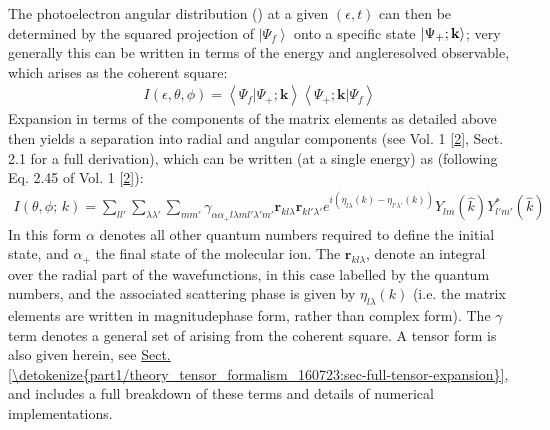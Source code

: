 \documentclass[letterpaper,table,10pt,english]{jupyterBook}
\begin{document}
\sphinxAtStartPar
The photoelectron angular distribution ({\hyperref[\detokenize{backmatter/glossary:term-PADs}]{}}) at a given \((\epsilon,t)\)
can then be determined by the squared projection of
\(\left|\Psi_f\right>\) onto a specific state
\(\left|\Psi_{+};\bf{k}\right>\); very generally this can be written in terms of the energy and angle\sphinxhyphen{}resolved observable, which arises as the coherent square:
\begin{equation}\label{equation:part1/theory_photoionization_dynamics_140723:eq:matE-sq-general}
\begin{split}
I(\epsilon,\theta,\phi)=\left<\Psi_f|\Psi_{+};\mathbf{k}\right>\left<\Psi_{+};\mathbf{k}|\Psi_f\right>
\end{split}
\end{equation}
\sphinxAtStartPar
Expansion in terms of the components of the matrix elements as detailed above then yields a separation into radial and angular components (see  Vol. 1 {[}\hyperlink{cite.backmatter/bibliography:id663}{2}{]}, Sect. 2.1 for a full derivation), which can be written (at a single energy) as (following Eq. 2.45 of  Vol. 1 {[}\hyperlink{cite.backmatter/bibliography:id663}{2}{]}):
\begin{equation}\label{equation:part1/theory_photoionization_dynamics_140723:eq:I-reduced-LF-2_45-vol1}
\begin{split}
I(\theta,\phi;\,k)=\sum_{ll'}\sum_{\lambda\lambda'}\sum_{mm'}\gamma_{\alpha\alpha_{+}l\lambda ml'\lambda'm'}\boldsymbol{r}_{kl\lambda}\boldsymbol{r}_{kl'\lambda'}e^{i(\eta_{l\lambda}(k)-\eta_{l'\lambda'}(k))}Y_{lm}(\hat{k})Y_{l'm'}^{*}(\hat{k})
\end{split}
\end{equation}
\sphinxAtStartPar
In this form \(\alpha\) denotes all other quantum numbers required to define the initial state, and \(\alpha_{+}\) the final state of the molecular ion. The {\hyperref[\detokenize{backmatter/glossary:term-radial-matrix-elements}]{}} \(\boldsymbol{r}_{kl\lambda}\), denote an integral over the radial part of the wavefunctions, in this case labelled by the {\hyperref[\detokenize{backmatter/glossary:term-MF}]{}} quantum numbers, and the associated scattering phase is given by \(\eta_{l\lambda}(k)\) (i.e. the matrix elements are written in magnitude\sphinxhyphen{}phase form, rather than complex form). The \(\gamma\) term denotes a general set of {\hyperref[\detokenize{backmatter/glossary:term-geometric-coupling-parameters}]{}} arising from the coherent square. A tensor form is also given herein, see \hyperref[\detokenize{part1/theory_tensor_formalism_160723:sec-full-tensor-expansion}]{Sect.\@ \ref{\detokenize{part1/theory_tensor_formalism_160723:sec-full-tensor-expansion}}}, and includes a full breakdown of these terms and details of numerical implementations.
\end{document}
